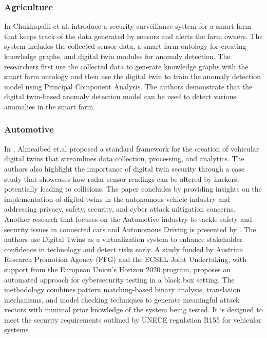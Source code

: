 \subsubsection{Agriculture}
In\cite{chukkapalliCyberPhysicalSystemSecurity2021} Chukkapalli et al. introduce a security surveillance system for a smart farm that keeps track of the data generated by sensors and alerts the farm owners. The system includes the collected sensor data, a smart farm ontology for creating knowledge graphs, and digital twin modules for anomaly detection. The researchers first use the collected data to generate knowledge graphs with the smart farm ontology and then use the digital twin to train the anomaly detection model using Principal Component Analysis. The authors demonstrate that the digital twin-based anomaly detection model can be used to detect various anomalies in the smart farm.

\subsubsection{Automotive}
In \cite{almeaibedDigitalTwinAnalysis2021}, Almeaibed et.al proposed a standard framework for the creation of vehicular digital twins that streamlines data collection, processing, and analytics. The authors also highlight the importance of digital twin security through a case study that showcases how radar sensor readings can be altered by hackers, potentially leading to collisions. The paper concludes by providing insights on the implementation of digital twins in the autonomous vehicle industry and addressing privacy, safety, security, and cyber attack mitigation concerns. Another research that focuses on the Automotive industry to tackle safety and security issues in connected cars and Autonomous Driving is presented by \cite{veledarDigitalTwinsDependability2019}. The authors use Digital Twins as a virtualization system to enhance stakeholder confidence in technology and detect risks early. A study\cite{marksteinerUsingCyberDigital2021} funded by Austrian Research Promotion Agency (FFG) and the ECSEL Joint Undertaking, with support from the European Union's Horizon 2020 program, proposes an automated approach for cybersecurity testing in a black box setting. The methodology combines pattern matching-based binary analysis, translation mechanisms, and model checking techniques to generate meaningful attack vectors with minimal prior knowledge of the system being tested. It is designed to meet the security requirements outlined by UNECE regulation R155 for vehicular systems  
